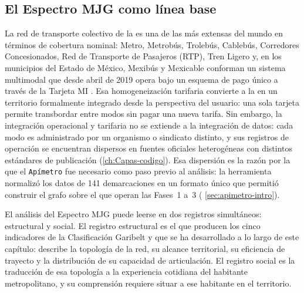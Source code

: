 \subsection{El Espectro MJG como línea base}
\label{subsubsec:espectro-cierre}

La red de transporte colectivo de la \zmvm{} es una de las más extensas del
mundo en términos de cobertura nominal: Metro, Metrobús, Trolebús, Cablebús,
Corredores Concesionados, Red de Transporte de Pasajeros (RTP), Tren Ligero y,
en los municipios del Estado de México, Mexibús y Mexicable conforman un sistema
multimodal que desde abril de 2019 opera bajo un esquema de pago único a través
de la Tarjeta MI \citep{gaceta_movilidad_2019}. Esa homogeneización tarifaria
convierte a la \zmvm{} en un territorio formalmente integrado desde la
perspectiva del usuario: una sola tarjeta permite transbordar entre modos sin
pagar una nueva tarifa. Sin embargo, la integración operacional y tarifaria no
se extiende a la integración de datos: cada modo es administrado por un
organismo o sindicato distinto, y sus registros de operación se encuentran
dispersos en fuentes oficiales heterogéneas con distintos estándares de
publicación (\autoref{ch:Capas-codigo}). Esa dispersión es la razón por la que
el \texttt{Apímetro} fue necesario como paso previo al análisis: la herramienta
normalizó los datos de 141 demarcaciones en un formato único que permitió
construir el grafo sobre el que operan las Fases~1 a~3 (
\autoref{sec:apimetro-intro}).

El análisis del Espectro MJG puede leerse en dos registros simultáneos:
estructural y social. El registro estructural es el que producen los cinco
indicadores de la Clasificación Garibelt y que se ha desarrollado a lo largo de
este capítulo: describe la topología de la red, su alcance territorial, su
eficiencia de trayecto y la distribución de su capacidad de articulación. El
registro social es la traducción de esa topología a la experiencia cotidiana del
habitante metropolitano, y su comprensión requiere situar a ese habitante en el
territorio.

